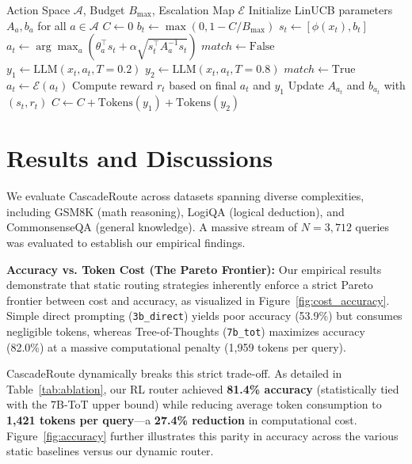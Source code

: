 \documentclass{article} %
\begin{document}
\begin{algorithm}[h]
\caption{CascadeRoute Online Execution}
\label{alg:cascaderoute}
\begin{algorithmic}[1]
\REQUIRE Action Space $\mathcal{A}$, Budget $B_{\max}$, Escalation Map $\mathcal{E}$
\STATE Initialize LinUCB parameters $A_a, b_a$ for all $a \in \mathcal{A}$
\STATE $C \leftarrow 0$ 
    \STATE $b_t \leftarrow \max(0, 1 - C / B_{\max})$
    \STATE $s_t \leftarrow [\phi(x_t), b_t]$
    \STATE $a_t \leftarrow \arg\max_{a} (\theta_a^\top s_t + \alpha \sqrt{s_t^\top A_a^{-1} s_t})$
    \STATE $match \leftarrow \text{False}$
        \STATE $y_1 \leftarrow \text{LLM}(x_t, a_t, T=0.2)$
        \STATE $y_2 \leftarrow \text{LLM}(x_t, a_t, T=0.8)$
            \STATE $match \leftarrow \text{True}$
        \ELSE
            \STATE $a_t \leftarrow \mathcal{E}(a_t)$ 
        \ENDIF
    \ENDWHILE
    \STATE Compute reward $r_t$ based on final $a_t$ and $y_1$
    \STATE Update $A_{a_t}$ and $b_{a_t}$ with $(s_t, r_t)$
    \STATE $C \leftarrow C + \text{Tokens}(y_1) + \text{Tokens}(y_2)$
\ENDFOR
\end{algorithmic}
\end{algorithm}

\section{Results and Discussions}

We evaluate CascadeRoute across datasets spanning diverse complexities, including GSM8K (math reasoning), LogiQA (logical deduction), and CommonsenseQA (general knowledge). A massive stream of $N=3,712$ queries was evaluated to establish our empirical findings.

\textbf{Accuracy vs. Token Cost (The Pareto Frontier):} Our empirical results demonstrate that static routing strategies inherently enforce a strict Pareto frontier between cost and accuracy, as visualized in Figure~\ref{fig:cost_accuracy}. Simple direct prompting (\texttt{3b\_direct}) yields poor accuracy (53.9\%) but consumes negligible tokens, whereas Tree-of-Thoughts (\texttt{7b\_tot}) maximizes accuracy (82.0\%) at a massive computational penalty (1,959 tokens per query). 

CascadeRoute dynamically breaks this strict trade-off. As detailed in Table~\ref{tab:ablation}, our RL router achieved \textbf{81.4\% accuracy} (statistically tied with the 7B-ToT upper bound) while reducing average token consumption to \textbf{1,421 tokens per query}---a \textbf{27.4\% reduction} in computational cost. Figure~\ref{fig:accuracy} further illustrates this parity in accuracy across the various static baselines versus our dynamic router.
\end{document}
